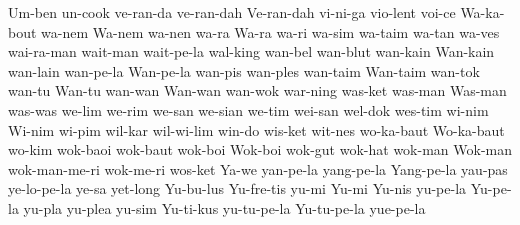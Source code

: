 {Um-ben
un-cook
ve-ran-da
ve-ran-dah
Ve-ran-dah
vi-ni-ga
vio-lent
voi-ce
Wa-ka-bout
wa-nem
Wa-nem
wa-nen
wa-ra
Wa-ra
wa-ri
wa-sim
wa-taim
wa-tan
wa-ves
wai-ra-man
wait-man
wait-pe-la
wal-king
wan-bel
wan-blut
wan-kain
Wan-kain
wan-lain
wan-pe-la
Wan-pe-la
wan-pis
wan-ples
wan-taim
Wan-taim
wan-tok
wan-tu
Wan-tu
wan-wan
Wan-wan
wan-wok
war-ning
was-ket
was-man
Was-man
was-was
we-lim
we-rim
we-san
we-sian
we-tim
wei-san
wel-dok
wes-tim
wi-nim
Wi-nim
wi-pim
wil-kar
wil-wi-lim
win-do
wis-ket
wit-nes
wo-ka-baut
Wo-ka-baut
wo-kim
wok-baoi
wok-baut
wok-boi
Wok-boi
wok-gut
wok-hat
wok-man
Wok-man
wok-man-me-ri
wok-me-ri
wos-ket
Ya-we
yan-pe-la
yang-pe-la
Yang-pe-la
yau-pas
ye-lo-pe-la
ye-sa
yet-long
Yu-bu-lus
Yu-fre-tis
yu-mi
Yu-mi
Yu-nis
yu-pe-la
Yu-pe-la
yu-pla
yu-plea
yu-sim
Yu-ti-kus
yu-tu-pe-la
Yu-tu-pe-la
yue-pe-la}
